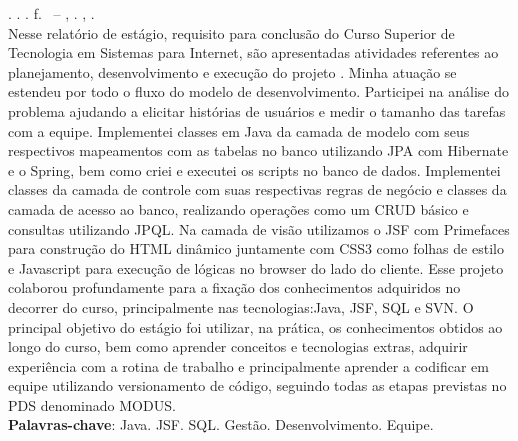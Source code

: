 
\begin{resumo}[RESUMO]
\begin{SingleSpacing}

\imprimirautorcitacao. \imprimirtitulo. \imprimirdata. \pageref {LastPage} f. \imprimirprojeto\ – \imprimirprograma, \imprimirinstituicao. \imprimirlocal, \imprimirdata.\\


Nesse relatório de estágio, requisito para conclusão do Curso Superior de Tecnologia em Sistemas para Internet, são apresentadas atividades referentes ao planejamento, desenvolvimento e execução do projeto \imprimirtitulo. Minha atuação se estendeu por todo o fluxo do modelo de desenvolvimento. Participei na análise do problema ajudando a elicitar histórias de usuários e medir o tamanho das tarefas com a equipe. Implementei classes em Java da camada de modelo com seus respectivos mapeamentos com as tabelas no banco utilizando JPA com Hibernate e o Spring, bem como criei e executei os scripts no banco de dados. Implementei classes da camada de controle com suas respectivas regras de negócio e classes da camada de acesso ao banco, realizando operações como um CRUD básico e consultas utilizando JPQL. Na camada de visão utilizamos o JSF com Primefaces para construção do HTML dinâmico juntamente com CSS3 como folhas de estilo e Javascript para execução de lógicas no browser do lado do cliente. Esse projeto colaborou profundamente para a fixação dos conhecimentos adquiridos no decorrer do curso, principalmente nas tecnologias:Java, JSF, SQL e SVN. O principal objetivo do estágio foi utilizar, na prática, os conhecimentos obtidos ao longo do curso, bem como aprender conceitos e tecnologias extras, adquirir experiência com a rotina de trabalho e principalmente aprender a codificar em equipe utilizando versionamento de código, seguindo todas as etapas previstas no PDS denominado MODUS. \\

\textbf{Palavras-chave}: Java. JSF. SQL. Gestão. Desenvolvimento. Equipe.

\end{SingleSpacing}
\end{resumo}

